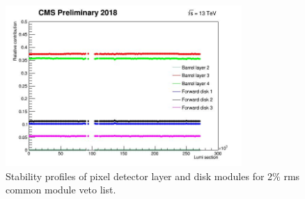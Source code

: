 \begin{figure}[!htp]
\centering
\includegraphics[width=0.8\textwidth]{ashish_thesis/2percentcommonveto_pixellayerdisk.png}
\caption[Pixel layer/disk stability]{%
   Stability profiles of pixel detector layer and disk modules for 2\% rms common module veto list.
}
\label{fig:stabprof}
\end{figure}















